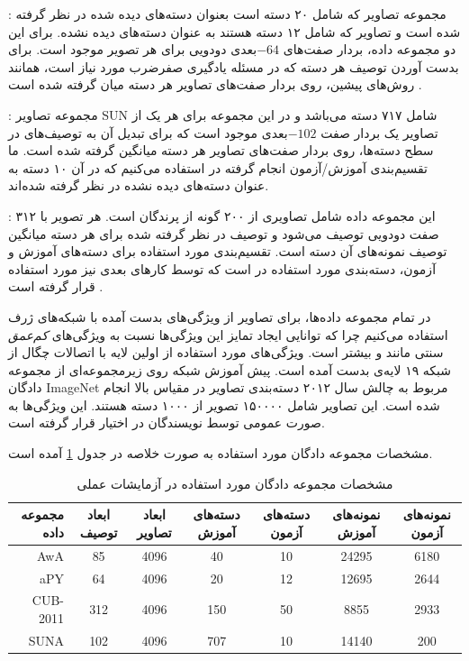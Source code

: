 \textbf{}\cite{farhadi09}:
مجموعه تصاویر
  \cite{pascal}
 که شامل ۲۰ دسته است بعنوان دسته‌های دیده شده در نظر گرفته شده است و تصاویر  که شامل ۱۲ دسته هستند به عنوان دسته‌های دیده نشده. برای این دو مجموعه داده، بردار صفت‌های $-64$بعدی دودویی برای هر تصویر موجود است. برای بدست آوردن توصیف هر دسته که در مسئله یادگیری صفرضرب مورد نیاز است، همانند روش‌های پیشین، روی بردار صفت‌های تصاویر هر دسته میان گرفته
 شده است  \cite{lampert09}.


\textbf{} \cite{sun}:
مجموعه تصاویر SUN شامل ۷۱۷ دسته می‌باشد و در این مجموعه برای هر یک از تصاویر یک بردار صفت $-102$بعدی موجود است که برای تبدیل آن به توصیف‌های در سطح دسته‌ها، روی بردار صفت‌های تصاویر هر دسته میانگین گرفته شده است. ما تقسیم‌بندی آموزش/آزمون انجام گرفته در \cite{jayaraman14} استفاده می‌کنیم که در آن ۱۰ دسته به عنوان دسته‌های دیده نشده در نظر گرفته شده‌اند.

\textbf{} \cite{cub}:
این مجموعه داده شامل تصاویری از ۲۰۰ گونه از پرندگان است. هر تصویر با ۳۱۲ صفت دودویی توصیف می‌شود و توصیف در نظر گرفته شده برای هر دسته میانگین توصیف نمونه‌های آن دسته است. تقسیم‌بندی مورد استفاده برای دسته‌های آموزش و آزمون، دسته‌بندی مورد استفاده در \cite{akata13} است که توسط کارهای بعدی نیز مورد استفاده قرار گرفته است
\cite{sse, Akata2015, Reed2016}.


در تمام مجموعه داده‌ها، برای تصاویر از ویژگی‌های بدست آمده با شبکه‌های ژرف استفاده می‌کنیم چرا که توانایی ایجاد تمایز این ویژگی‌ها نسبت به ویژگی‌های
\textit{کم‌عمق}
سنتی مانند   و   بیشتر است.
ویژگی‌های مورد استفاده از  اولین لایه با اتصالات چگال از شبکه ۱۹ لایه‌ی  \cite{vgg} بدست آمده است. پیش آموزش شبکه  روی زیرمجموعه‌ای از
مجموعه دادگان ImageNet
\cite{imagenet}
مربوط به چالش سال ۲۰۱۲ دسته‌بندی تصاویر در مقیاس بالا
 \cite{ILSVRC15} انجام شده است.
 این تصاویر شامل ۱۵۰۰۰۰ تصویر از ۱۰۰۰ دسته هستند.
 این ویژگی‌ها به صورت عمومی توسط نویسندگان
\cite{sse}
در اختیار قرار گرفته است.

مشخصات مجموعه دادگان مورد استفاده به صورت خلاصه در جدول \ref{tab:datasets} آمده است.
\begin{center}

\begin{table}[ht]
\centering
\caption{مشخصات مجموعه دادگان مورد استفاده در آزمایشات عملی}
\vspace{2mm}
\label{tab:datasets}
\begin{tabular}{|r|c|c|c|c|c|c|}
\hline
 مجموعه داده & ابعاد توصیف‌ & ابعاد تصاویر &  دسته‌های آموزش & دسته‌های آزمون &  نمونه‌های آموزش &  نمونه‌های آزمون \\
\hline
AwA
& 85 & 4096 & 40 & 10 & 24295 & 6180 \\\hline
 aPY
& 64 & 4096 & 20 & 12 & 12695 & 2644 \\\hline
CUB-2011
& 312 & 4096 & 150 & 50 & 8855 & 2933 \\ \hline
 SUNA
& 102 & 4096 & 707 & 10 & 14140 & 200 \\
\hline
\end{tabular}
\end{table}
\end{center}


